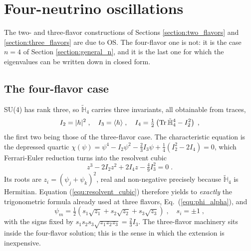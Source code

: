 \documentclass[final,5p,times,twocolumn]{elsarticle}
\newcommand{\eq}{Eq.}
\newcommand{\equ}[1]{\eq~(\ref{equ:#1})}
\providecommand{\DIFaddtex}[1]{{\protect\color{blue} \sf #1}} %
\providecommand{\DIFaddbegin}{} %
\providecommand{\DIFadd}[1]{\DIFaddtex{#1}} %
\begin{document}


\DIFaddbegin \section{\DIFadd{Four-neutrino oscillations}}
\label{section:four_flavors}

\DIFadd{The two- and three-flavor constructions of Sections \ref{section:two_flavors} and \ref{section:three_flavors} are due to OS.  The four-flavor one is not: it is the case $n=4$ of Section \ref{section:general_n}, and it is the last one for which the eigenvalues can be written down in closed form.
}

\subsection{\DIFadd{The four-flavor case}}
\label{section:4nu_case}

\DIFadd{SU(4) has rank three, so $\tilde{\mathbb{H}}_4$ carries three invariants, all obtainable from traces,
}\begin{equation}
 \label{equ:invariants_4nu}
 I_2 = \lvert h \rvert^2 \;, \quad
 I_3 = \langle h \rangle \;, \quad
 I_4 = \tfrac{1}{2}\left({\rm Tr}\,\tilde{\mathbb{H}}_4^4 - I_2^2\right) \;,
\end{equation}
\DIFadd{the first two being those of the three-flavor case.  The characteristic equation is the depressed quartic $\chi(\psi) = \psi^4 - I_2\psi^2 - \frac{2}{3}I_3\psi + \frac{1}{4}(I_2^2 - 2I_4) = 0$, which Ferrari-Euler reduction turns into the resolvent cubic
}\begin{equation}
 \label{equ:resolvent_cubic}
 z^3 - 2I_2 z^2 + 2I_4 z - \tfrac{4}{9}I_3^2 = 0 \;.
\end{equation}
\DIFadd{Its roots are $z_i = (\psi_j+\psi_k)^2$, real and non-negative precisely because $\tilde{\mathbb{H}}_4$ is Hermitian.  Equation (\ref{equ:resolvent_cubic}) therefore yields to }\emph{\DIFadd{exactly}} \DIFadd{the trigonometric formula already used at three flavors, \equ{phi_alpha}, and
}\begin{equation}
 \label{equ:psi_4nu}
 \psi_m = \tfrac{1}{2}\left(s_1\sqrt{z_1}+s_2\sqrt{z_2}+s_3\sqrt{z_3}\right) \;,
 \quad
 s_i = \pm 1 \;,
\end{equation}
\DIFadd{with the signs fixed by $s_1s_2s_3\sqrt{z_1z_2z_3} = \frac{2}{3}I_3$.  The three-flavor machinery sits inside the four-flavor solution; this is the sense in which the extension is inexpensive.
}
\end{document}
